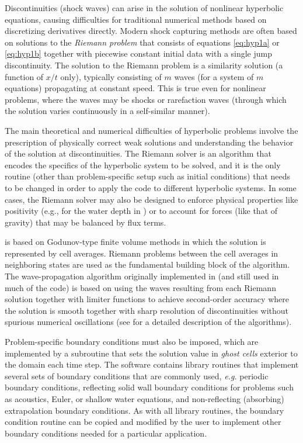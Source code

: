 Discontinuities (shock waves) can arise in the solution of nonlinear
hyperbolic equations, causing difficulties for traditional numerical
methods based on discretizing derivatives directly.  Modern shock
capturing methods are often based on solutions to the {\em Riemann
problem} that consists of equations \cref{eq:hyp1a} or
\cref{eq:hyp1b} together with piecewise constant initial data with a
single jump discontinuity.  The solution to the Riemann problem is a
similarity solution (a function of $x/t$ only), typically consisting
of $m$ waves (for a system of $m$ equations) propagating at constant
speed.  This is true even for nonlinear problems, where the waves may
be shocks or rarefaction waves (through which the
solution varies continuously in a self-similar manner).

The main theoretical and numerical difficulties of hyperbolic problems
involve the prescription of physically correct weak solutions and
understanding the behavior of the solution at discontinuities.  The
Riemann solver is an algorithm that encodes the specifics of the
hyperbolic system to be solved, and it is the only routine (other than
problem-specific setup such as initial conditions) 
that needs to be changed in order to apply the
code to different hyperbolic systems.  In some cases, the Riemann
solver may also be designed to enforce physical properties like
positivity (e.g., for the water depth in \geoclaw) or to account for
forces (like that of gravity) that may be balanced by flux terms.

\clawpack is based on Godunov-type finite volume methods in which
the solution is represented by cell averages.  Riemann problems
between the cell averages in neighboring states are used as the
fundamental building block of the algorithm.
The wave-propagation algorithm originally
implemented in \clawpack (and still used in much of the code) is based on
using the waves resulting from each Riemann solution together with limiter
functions to achieve second-order accuracy where the solution is smooth
together with sharp resolution of discontinuities without spurious numerical
oscillations (see \cite{rjl:fvmhp} for a detailed description of the
algorithms).   

Problem-specific boundary conditions must also be imposed, which
are implemented by a subroutine that sets the solution value in
{\em ghost cells} exterior to the domain each time step.  The
\clawpack software contains library routines that implement several
sets of boundary conditions that are commonly used, {\em e.g.}
periodic boundary conditions, reflecting solid wall boundary
conditions for problems such as acoustics, Euler, or shallow water
equations, and non-reflecting (absorbing) extrapolation boundary
conditions.  As with all \clawpack library routines, the boundary
condition routine can be copied and modified by the user to implement
other boundary conditions needed for a particular application.

